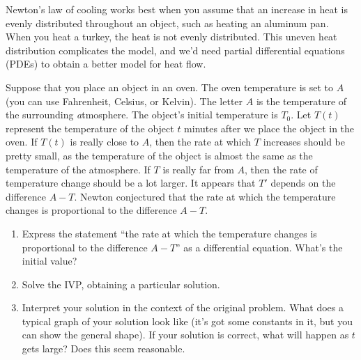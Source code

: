 Newton's law of cooling works best when you assume that an increase in heat is evenly distributed throughout an object, such as heating an aluminum pan. When you heat a turkey, the heat is not evenly distributed. 
This uneven heat distribution complicates the model, and we'd need partial differential equations (PDEs) to obtain a better model for heat flow.  

 
\begin{problem}
 Suppose that you place an object in an oven.  The oven temperature is set to $A$ (you can use Fahrenheit, Celsius, or Kelvin). The letter $A$ is the temperature of the surrounding \emph{a}tmosphere. The object's initial temperature is $T_0$.  
Let $T(t)$ represent the temperature of the object $t$ minutes after we place the object in the oven. 
If $T(t)$ is really close to $A$, then the rate at which $T$ increases should be pretty small, as the temperature of the object is almost the same as the temperature of the atmosphere.  
If $T$ is really far from $A$, then the rate of temperature change should be a lot larger.  It appears that $T'$ depends on the difference $A-T$.  Newton conjectured that the rate at which the temperature changes is proportional to the difference $A-T$.
\begin{enumerate}
 \item Express the statement ``the rate at which the temperature changes is proportional to the difference $A-T$'' as a differential equation. What's the initial value?
 \item 
{}%
Solve the IVP,  obtaining a particular solution.
 \item Interpret your solution in the context of the original problem. What does a typical graph of your solution look like (it's got some constants in it, but you can show the general shape). If your solution is correct, what will happen as $t$ gets large? Does this seem reasonable.
\end{enumerate}
\end{problem}
 

